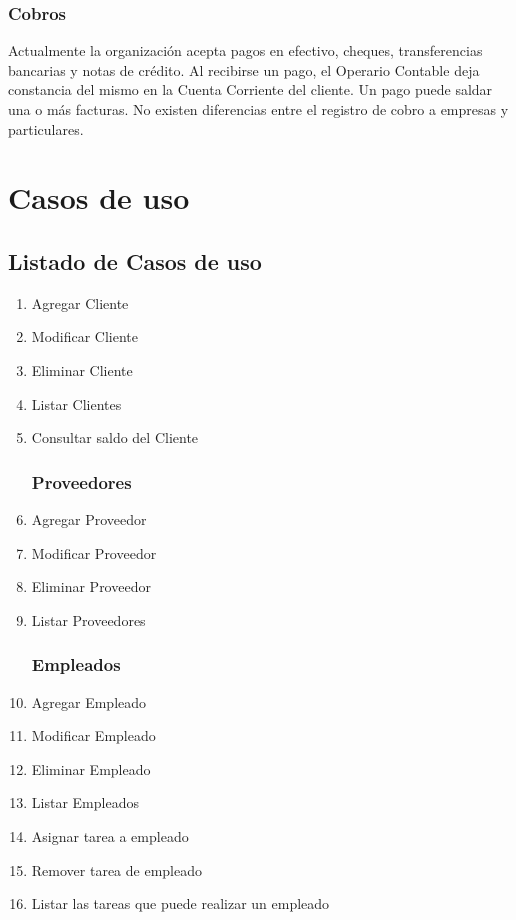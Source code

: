 \documentclass[12pt]{extarticle}
\begin{document}
\begin{spacing}{1.2}
	\subsubsection{Cobros}
     Actualmente la organización acepta pagos en efectivo, cheques, transferencias bancarias y notas de crédito. Al recibirse un pago, el Operario Contable deja constancia del mismo en la Cuenta Corriente del cliente. Un pago puede saldar una o más facturas. No existen diferencias entre el registro de cobro a empresas y particulares.\\



    \clearpage
    \section{Casos de uso}
    \subsection{Listado de Casos de uso}
    \begin{multicols}{2}
    \begin{enumerate}	
        \subsubsection*{Clientes}
            \item Agregar Cliente
            \item Modificar Cliente
            \item Eliminar Cliente
            \item Listar Clientes
            \item Consultar saldo del Cliente
        \subsubsection*{Proveedores}
            \item Agregar Proveedor
            \item Modificar Proveedor
            \item Eliminar Proveedor
            \item Listar Proveedores	
        \subsubsection*{Empleados}
            \item Agregar Empleado
            \item Modificar Empleado
            \item Eliminar Empleado
            \item Listar Empleados	
            \item Asignar tarea a empleado
            \item Remover tarea de empleado
            \item Listar las tareas que puede realizar un empleado

\end{enumerate}
\end{multicols}
\end{spacing}
\end{document}
